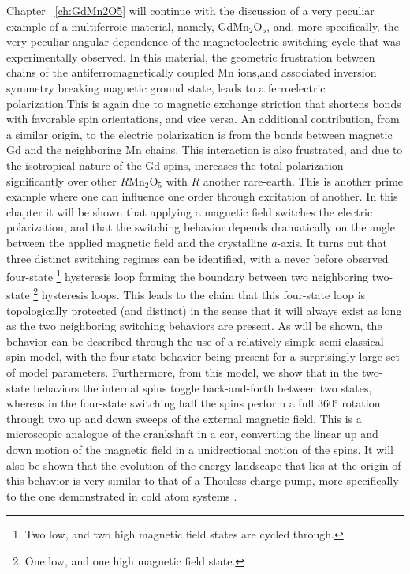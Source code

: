 Chapter ~\ref{ch:GdMn2O5} will continue with the discussion of a very peculiar example of a multiferroic material, namely, GdMn$_2$O$_5$, and, more specifically, the very peculiar angular dependence of the magnetoelectric switching cycle that was experimentally observed.
In this material, the geometric frustration between chains of the antiferromagnetically coupled Mn ions,and associated inversion symmetry breaking magnetic ground state, leads to a ferroelectric polarization.This is again due to magnetic exchange striction that shortens bonds with favorable spin orientations, and vice versa.
An additional contribution, from a similar origin, to the electric polarization is from the bonds between magnetic Gd and the neighboring Mn chains. This interaction is also frustrated, and due to the isotropical nature of the Gd spins, increases the total polarization significantly over other $R$Mn$_2$O$_5$ with $R$ another rare-earth.
This is another prime example where one can influence one order through excitation of another.
In this chapter it will be shown that applying a magnetic field switches the electric polarization, and that the switching behavior depends dramatically on the angle between the applied magnetic field and the crystalline $a$-axis.
It turns out that three distinct switching regimes can be identified, with a never before observed four-state \footnote{Two low, and two high magnetic field states are cycled through.} hysteresis loop forming the boundary between two neighboring two-state \footnote{One low, and one high magnetic field state.} hysteresis loops. 
This leads to the claim that this four-state loop is topologically protected (and distinct) in the sense that it will always exist as long as the two neighboring switching behaviors are present.
As will be shown, the behavior can be described through the use of a relatively simple semi-classical spin model, with the four-state behavior being present for a surprisingly large set of model parameters.
Furthermore, from this model, we show that in the two-state behaviors the internal spins toggle back-and-forth between two states, whereas in the four-state switching half the spins perform a full 360$^\circ$ rotation through two up and down sweeps of the external magnetic field.
This is a microscopic analogue of the crankshaft in a car, converting the linear up and down motion of the magnetic field in a unidrectional motion of the spins.
It will also be shown that the evolution of the energy landscape that lies at the origin of this behavior is very similar to that of a Thouless charge pump, more specifically to the one demonstrated in cold atom systems . 

